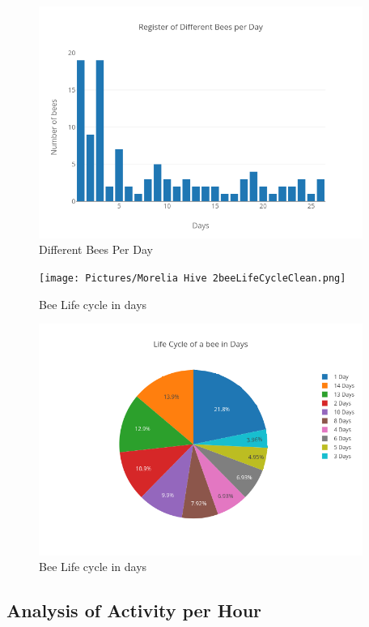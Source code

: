 \documentclass[11pt,fleqn]{book} %
\begin{document}
\begin{figure}[h!]%
\centering%
\includegraphics[width=400px]{Pictures/Morelia Hive 2differentBeesPerdayClean.png}%
\caption{Different Bees Per Day}%
\end{figure}

%


\begin{figure}[h!]%
\centering%
\texttt{[image: Pictures/Morelia Hive 2beeLifeCycleClean.png]}%
\caption{Bee Life cycle in days}%
\end{figure}

%


\begin{figure}[h!]%
\centering%
\includegraphics[width=400px]{Pictures/Morelia Hive 2pieBeeLifeCycleClean.png}%
\caption{Bee Life cycle in days}%
\end{figure}

%
\subsection{Analysis of Activity per Hour}%
\label{subsec:Analysis of Activity per Hour}%
\end{document}
